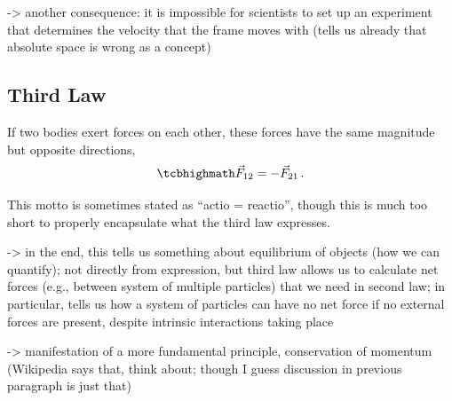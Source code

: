 \documentclass[../class_mech_main.tex]{subfiles}
\begin{document}


-> another consequence: it is impossible for scientists to set up an experiment that determines the velocity that the frame moves with (tells us already that absolute space is wrong as a concept)



		\subsection{Third Law}
\begin{axiom}
	\centering
	If two bodies exert forces on each other, these forces have the same magnitude but opposite directions,
	\begin{equation}\label{eq:newton_third_law}
		\eqbox{
			\vec{F}_{12} = - \vec{F}_{21}
		} \, .
	\end{equation}
\end{axiom}
This motto is sometimes stated as \enquote{actio = reactio}, though this is much too short to properly encapsulate what the third law expresses.


-> in the end, this tells us something about equilibrium of objects (how we can quantify); not directly from expression, but third law allows us to calculate net forces (e.g., between system of multiple particles) that we need in second law; in particular, tells us how a system of particles can have no net force if no external forces are present, despite intrinsic interactions taking place


-> manifestation of a more fundamental principle, conservation of momentum (Wikipedia says that, think about; though I guess discussion in previous paragraph is just that)
\end{document}
